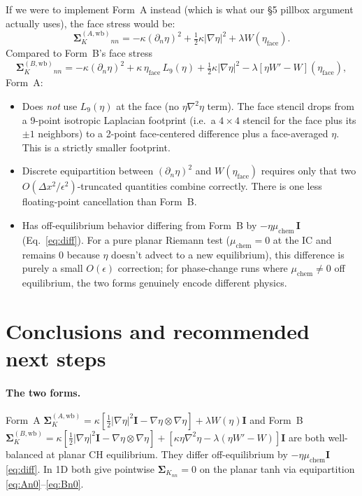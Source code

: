 \documentclass[11pt]{article}
\newcommand{\grad}{\nabla}
\newcommand{\II}{\mathbf{I}}
\newcommand{\SK}{\boldsymbol{\Sigma}_K}
\newcommand{\dxn}{\partial_n}
\begin{document}
If we were to implement Form~A instead (which is what our \S5 pillbox
argument actually uses), the face stress would be:
\begin{equation}
\SK^{(A,\mathrm{wb})}_{nn} = -\kappa(\dxn\eta)^2 + \tfrac12\kappa|\grad\eta|^2 + \lambda W(\eta_{\mathrm{face}}).
\label{eq:Afaces}
\end{equation}
Compared to Form~B's face stress
\begin{equation}
\SK^{(B,\mathrm{wb})}_{nn} = -\kappa(\dxn\eta)^2 + \kappa\,\eta_{\mathrm{face}}\,L_9(\eta) + \tfrac12\kappa|\grad\eta|^2 - \lambda[\eta W' - W](\eta_{\mathrm{face}}),
\label{eq:Bfaces}
\end{equation}
Form~A:
\begin{itemize}
\item Does \emph{not} use $L_9(\eta)$ at the face (no $\eta\grad^2\eta$ term). The face stencil drops from a 9-point isotropic Laplacian footprint (i.e.\ a $4\!\times\!4$ stencil for the face plus its $\pm1$ neighbors) to a 2-point face-centered difference plus a face-averaged $\eta$. This is a strictly smaller footprint.
\item Discrete equipartition between $(\dxn\eta)^2$ and $W(\eta_{\mathrm{face}})$ requires only that two
$O(\Delta x^2/\epsilon^2)$-truncated quantities combine correctly. There is one less floating-point cancellation than Form~B.
\item Has off-equilibrium behavior differing from Form~B by $-\eta\mu_{\mathrm{chem}}\,\II$ (Eq.\ \ref{eq:diff}). For a pure planar Riemann test ($\mu_{\mathrm{chem}}=0$ at the IC and remains 0 because $\eta$ doesn't advect to a new equilibrium), this difference is purely a small $O(\epsilon)$ correction; for phase-change runs where $\mu_{\mathrm{chem}}\ne 0$ off equilibrium, the two forms genuinely encode different physics.
\end{itemize}

\section{Conclusions and recommended next steps}

\paragraph{The two forms.} Form~A
$\SK^{(A,\mathrm{wb})} = \kappa[\tfrac12|\grad\eta|^2\II - \grad\eta\otimes\grad\eta] + \lambda W(\eta)\II$
and Form~B
$\SK^{(B,\mathrm{wb})} = \kappa[\tfrac12|\grad\eta|^2\II - \grad\eta\otimes\grad\eta] + [\kappa\eta\grad^2\eta - \lambda(\eta W'-W)]\II$
are both well-balanced at planar CH equilibrium. They differ
off-equilibrium by $-\eta\mu_{\mathrm{chem}}\II$ \eqref{eq:diff}. In 1D
both give pointwise $\SK_{nn}=0$ on the planar tanh via equipartition
\eqref{eq:An0}--\eqref{eq:Bn0}.
\end{document}
